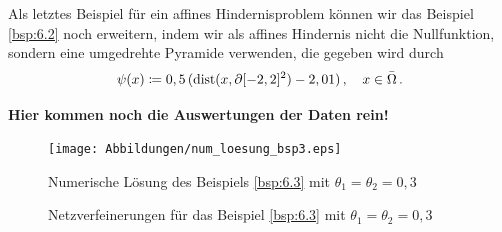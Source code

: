 \begin{bsp}\label{bsp:6.3}
Als letztes Beispiel für ein affines Hindernisproblem können wir das Beispiel \ref{bsp:6.2} noch erweitern, indem wir als affines Hindernis nicht die Nullfunktion, sondern eine umgedrehte Pyramide verwenden, die gegeben wird durch
\[
	\psi (x) \coloneqq 0,5 \,  (\operatorname{dist} (x,\partial [-2,2]^2)-2,01) \, , \quad x \in \bar \Omega \, .
\]

\textbf{Hier kommen noch die Auswertungen der Daten rein!}


\begin{figure}[h]
\begin{center}
\texttt{[image: Abbildungen/num\_loesung\_bsp3.eps]}
\end{center}
\caption{Numerische Lösung des Beispiels \ref{bsp:6.3} mit $\theta_1=\theta_2 = 0,3$}
\end{figure}


\begin{figure}[h]
\begin{center}
\hfill
{}
\end{center}
\caption{Netzverfeinerungen für das Beispiel \ref{bsp:6.3} mit $\theta_1=\theta_2=0,3$}
\end{figure}
\end{bsp}


